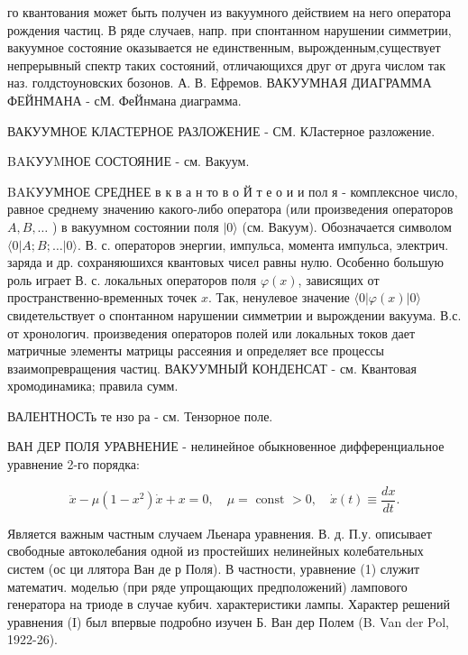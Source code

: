 \documentclass[10pt]{article}
\begin{document}
го квантования может быть получен из вакуумного действием на него оператора рождения частиц. В ряде случаев, напр. при спонтанном нарушении симметрии, вакуумное состояние оказывается не единственным, вырожденным,существует непрерывный спектр таких состояний, отличающихся друг от друга числом так наз. голдстоуновских бозонов. А. В. Ефремов. ВАКУУМНАЯ ДИАГРАММА ФЕЙНМАНА - сМ. ФеЙнмана диаграмма.



ВАКУУМНОЕ КЛАСТЕРНОЕ РАЗЛОЖЕНИЕ - СМ. КЛастерное разложение.



BAKУУMНОЕ СОСТОЯНИЕ - см. Вакуум.



BAKУУМНОЕ СРЕДНЕЕ в к в а н то в о Й т е о и и пол я - комплексное число, равное среднему значению какого-либо оператора (или произведения операторов $A, B, \ldots$ ) в вакуумном состоянии поля $|0\rangle$ (см. Вакуум). Обозначается символом $\langle 0|A ; B ; \ldots| 0\rangle$. В. с. операторов энергии, импульса, момента импульса, электрич. заряда и др. сохраняюшихся квантовых чисел равны нулю. Особенно большую роль играет В. с. локальных операторов поля $\varphi(x)$, зависящих от пространственно-временных точек $x$. Так, ненулевое значение $\langle 0|\varphi(x)| 0\rangle$ свидетельствует о спонтанном нарушении симметрии и вырождении вакуума. В.с. от хронологич. произведения операторов полей или локальных токов дает матричные элементы матрицы рассеяния и определяет все процессы взаимопревращения частиц. ВАКУУМНЫЙ КОНДЕНСАТ - см. Квантовая хромодинамика; правила сумм.



ВАЛЕНТНОСТь те нзо ра - см. Тензорное поле.



ВАН ДЕР ПОЛЯ УРАВНЕНИЕ - нелинейное обыкновенное дифференциальное уравнение 2-го порядка:



\[

\ddot{x}-\mu\left(1-x^{2}\right) \dot{x}+x=0, \quad \mu=\text { const }>0, \quad \dot{x}(t) \equiv \frac{d x}{d t} .

\]



Является важным частным случаем Льенара уравнения. В. д. П.у. описывает свободные автоколебания одной из простейших нелинейных колебательных систем (ос ци ллятора Ван де р Поля). В частности, уравнение (1) служит математич. моделью (при ряде упрощающих предположений) лампового генератора на триоде в случае кубич. характеристики лампы. Характер решений уравнения (I) был впервые подробно изучен Б. Ван дер Полем (B. Van der Pol, 1922-26).
\end{document}
